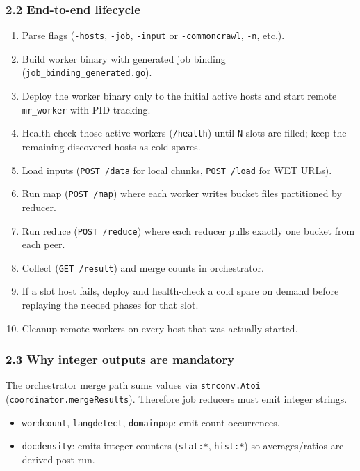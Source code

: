 \documentclass[
]{article}
\providecommand{\tightlist}{%
  \setlength{\itemsep}{0pt}\setlength{\parskip}{0pt}}
\begin{document}
\subsubsection{2.2 End-to-end lifecycle}\label{end-to-end-lifecycle}

\begin{enumerate}
\def\labelenumi{\arabic{enumi}.}
\tightlist
\item
  Parse flags (\texttt{-hosts}, \texttt{-job}, \texttt{-input} or
  \texttt{-commoncrawl}, \texttt{-n}, etc.).
\item
  Build worker binary with generated job binding
  (\texttt{job\_binding\_generated.go}).
\item
  Deploy the worker binary only to the initial active hosts and start
  remote \texttt{mr\_worker} with PID tracking.
\item
  Health-check those active workers (\texttt{/health}) until \texttt{N}
  slots are filled; keep the remaining discovered hosts as cold spares.
\item
  Load inputs (\texttt{POST\ /data} for local chunks,
  \texttt{POST\ /load} for WET URLs).
\item
  Run map (\texttt{POST\ /map}) where each worker writes bucket files
  partitioned by reducer.
\item
  Run reduce (\texttt{POST\ /reduce}) where each reducer pulls exactly
  one bucket from each peer.
\item
  Collect (\texttt{GET\ /result}) and merge counts in orchestrator.
\item
  If a slot host fails, deploy and health-check a cold spare on demand
  before replaying the needed phases for that slot.
\item
  Cleanup remote workers on every host that was actually started.
\end{enumerate}

\subsubsection{2.3 Why integer outputs are
mandatory}\label{why-integer-outputs-are-mandatory}

The orchestrator merge path sums values via \texttt{strconv.Atoi}
(\texttt{coordinator.mergeResults}). Therefore job reducers must emit
integer strings.

\begin{itemize}
\tightlist
\item
  \texttt{wordcount}, \texttt{langdetect}, \texttt{domainpop}: emit
  count occurrences.
\item
  \texttt{docdensity}: emits integer counters (\texttt{stat:*},
  \texttt{hist:*}) so averages/ratios are derived post-run.
\end{itemize}
\end{document}
